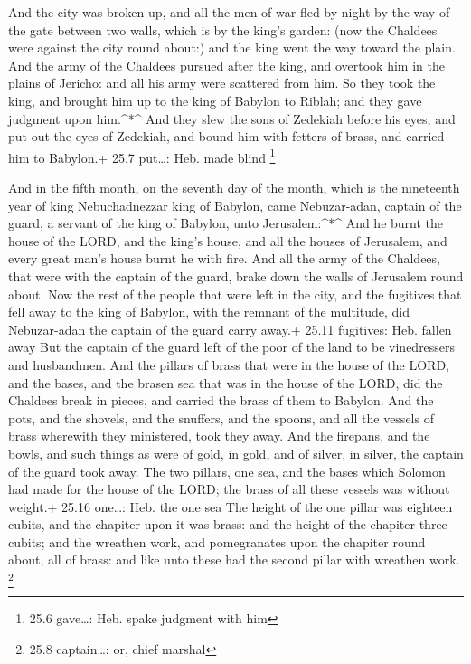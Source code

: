  And the city was broken up, and all the men of war fled by
night by the way of the gate between two walls, which is by the king's
garden: (now the Chaldees were against the city round about:) and the
king went the way toward the plain.  And the army of the
Chaldees pursued after the king, and overtook him in the plains of
Jericho: and all his army were scattered from him.  So they
took the king, and brought him up to the king of Babylon to Riblah; and
they gave judgment upon him.\^{}*\^{}  And they slew the
sons of Zedekiah before his eyes, and put out the eyes of Zedekiah, and
bound him with fetters of brass, and carried him to Babylon.+ 25.7
put\ldots: Heb. made blind \footnote{25.6 gave\ldots: Heb. spake
  judgment with him}

 And in the fifth month, on the seventh day of the month,
which is the nineteenth year of king Nebuchadnezzar king of Babylon,
came Nebuzar-adan, captain of the guard, a servant of the king of
Babylon, unto Jerusalem:\^{}*\^{}  And he burnt the house of
the LORD, and the king's house, and all the houses of Jerusalem, and
every great man's house burnt he with fire.  And all the
army of the Chaldees, that were with the captain of the guard, brake
down the walls of Jerusalem round about.  Now the rest of
the people that were left in the city, and the fugitives that fell away
to the king of Babylon, with the remnant of the multitude, did
Nebuzar-adan the captain of the guard carry away.+ 25.11 fugitives: Heb.
fallen away  But the captain of the guard left of the poor
of the land to be vinedressers and husbandmen.  And the
pillars of brass that were in the house of the LORD, and the bases, and
the brasen sea that was in the house of the LORD, did the Chaldees break
in pieces, and carried the brass of them to Babylon.  And
the pots, and the shovels, and the snuffers, and the spoons, and all the
vessels of brass wherewith they ministered, took they away.
 And the firepans, and the bowls, and such things as were
of gold, in gold, and of silver, in silver, the captain of the guard
took away.  The two pillars, one sea, and the bases which
Solomon had made for the house of the LORD; the brass of all these
vessels was without weight.+ 25.16 one\ldots: Heb. the one sea
 The height of the one pillar was eighteen cubits, and the
chapiter upon it was brass: and the height of the chapiter three cubits;
and the wreathen work, and pomegranates upon the chapiter round about,
all of brass: and like unto these had the second pillar with wreathen
work. \footnote{25.8 captain\ldots: or, chief marshal}

